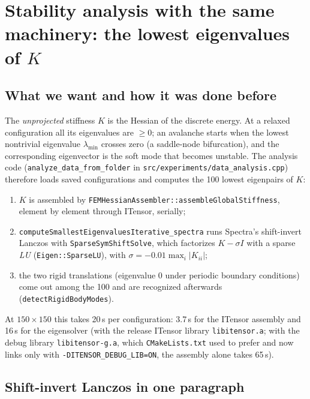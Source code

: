 \documentclass[11pt,a4paper]{article}
\theoremstyle{remark}
\newcommand{\code}[1]{\texttt{#1}}
\begin{document}
\section{Stability analysis with the same machinery: the lowest eigenvalues of $K$}
\label{sec:eig}

\subsection{What we want and how it was done before}

The \emph{unprojected} stiffness $K$ is the Hessian of the discrete energy. At a relaxed
configuration all its eigenvalues are $\ge0$; an avalanche starts when the lowest nontrivial
eigenvalue $\lambda_{\min}$ crosses zero (a saddle-node bifurcation), and the corresponding
eigenvector is the soft mode that becomes unstable. The analysis code
(\code{analyze\_\allowbreak{}data\_\allowbreak{}from\_\allowbreak{}folder} in \code{src/\allowbreak{}experiments/\allowbreak{}data\_\allowbreak{}analysis.cpp})
therefore loads saved configurations and computes the 100 lowest eigenpairs of $K$:
\begin{enumerate}[leftmargin=*]
\item $K$ is assembled by \code{FEMHessianAssembler::\allowbreak{}assembleGlobalStiffness}, element by element
through ITensor, serially;
\item \code{computeSmallestEigenvaluesIterative\_\allowbreak{}spectra} runs Spectra's shift-invert Lanczos
with \code{SparseSymShiftSolve}, which factorizes $K-\sigma I$ with a sparse \emph{LU}
(\code{Eigen::\allowbreak{}SparseLU}), with $\sigma=-0.01\max_i|K_{ii}|$;
\item the two rigid translations (eigenvalue $0$ under periodic boundary conditions) come out
among the 100 and are recognized afterwards (\code{detectRigidBodyModes}).
\end{enumerate}
At $150\times150$ this takes 20\,s per configuration: 3.7\,s for the ITensor assembly and 16\,s
for the eigensolver (with the release ITensor library \code{libitensor.a}; with the debug library
\code{libitensor-g.a}, which \code{CMakeLists.txt} used to prefer and now links only with
\code{-DITENSOR\_\allowbreak{}DEBUG\_\allowbreak{}LIB=ON}, the assembly alone takes 65\,s).

\subsection{Shift-invert Lanczos in one paragraph}
\end{document}
